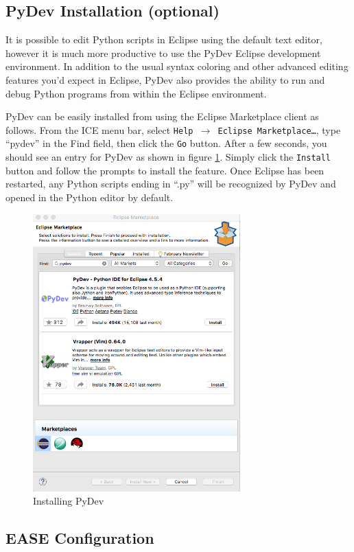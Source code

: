 \subsection{PyDev Installation (optional)} 

It is possible to edit Python scripts in Eclipse using the default text editor,
however it is much more productive to use the PyDev Eclipse development
environment. In addition to the usual syntax coloring and other advanced editing
features you'd expect in Eclipse, PyDev also provides the ability to run and
debug Python programs from within the Eclipse environment.

PyDev can be easily installed from using the Eclipse Marketplace client as
follows. From the ICE menu bar, select \texttt{Help $\rightarrow$ Eclipse
Marketplace\ldots}, type ``pydev'' in the Find field, then click the \texttt{Go}
button.
After a few seconds, you should see an entry for PyDev as shown in figure
\ref{fig:pydev}.
Simply click the \texttt{Install} button and follow the prompts to install the feature. Once
Eclipse has been restarted, any Python scripts ending in ``.py'' will be recognized by
PyDev and opened in the Python editor by default.

\begin{figure}[!ht]
\centering
\includegraphics[width=8cm]{images/pydev-marketplace}
\caption{Installing PyDev}
\label{fig:pydev}
\end{figure}

\subsection{EASE Configuration}

